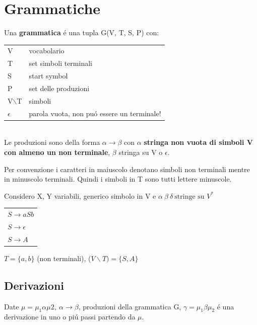 \section{Grammatiche}

Una \textbf{grammatica} \'e una tupla G(V, T, S, P) con:
\begin{tabular}{ll}
V & vocabolario\\
T & set simboli terminali\\
S & start symbol\\
P & set delle produzioni\\
V$\backslash$T & simboli\\
$\epsilon$ & parola vuota, non pu\'o essere un terminale!\\
\end{tabular}\\[5pt]

Le produzioni sono della forma $\alpha \rightarrow \beta$ con $\alpha$ 
\textbf{stringa non vuota di simboli V con almeno un non terminale},
$\beta $ stringa su V o $\epsilon $.


\begin{tcolorbox}\begin{center}
Per convenzione i caratteri in maiuscolo denotano simboli non terminali mentre in minuscolo terminali. Quindi i simboli in T sono 
tutti lettere minuscole.
\end{center}\end{tcolorbox}

Considero X, Y variabili, generico simbolo in V e $\alpha\ \beta\ \delta\ \text{stringe su } V^*$ \\
\begin{tabular}{l}
$S \rightarrow aSb$ \\
$S\rightarrow \epsilon$\\
$S \rightarrow A$\\
\end{tabular}
$T=\{a, b\}$ (non terminali), ($V\backslash T) = \{S, A\} $\\

\subsection{Derivazioni}
Date 
$\mu = \mu_1 \alpha \mu2,\ \alpha \rightarrow \beta$, produzioni della grammatica G, $\gamma = \mu_1 \beta \mu_2$ \'e una 
derivazione in uno o pi\'u passi partendo da $\mu$.\\

